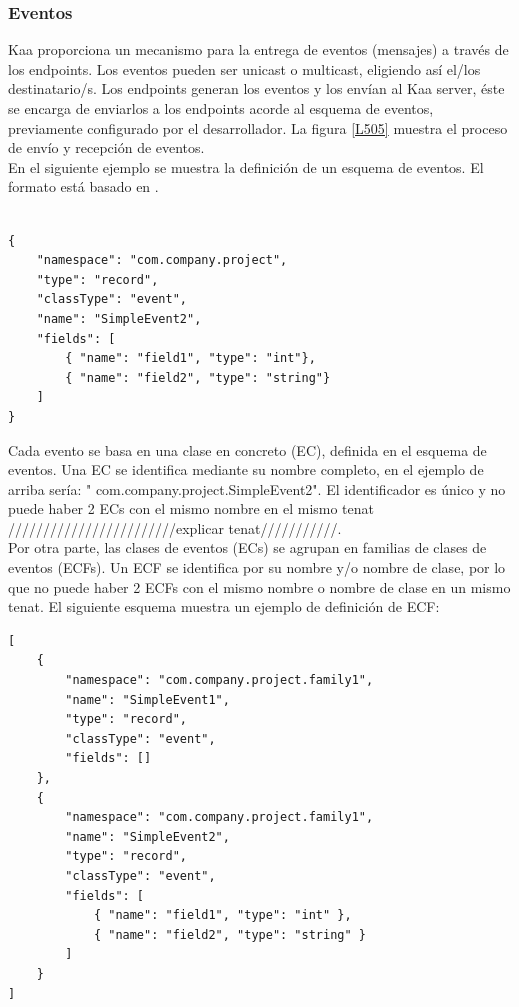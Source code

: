 \documentclass[12pt, twoside]{book}
\newcommand{\MYhref}[3][blue]{\href{#2}{\color{#1}{#3}}}
\begin{document}
\subsubsection*{Eventos}
Kaa proporciona un mecanismo para la entrega de eventos (mensajes) a través de los endpoints. Los eventos pueden ser unicast o multicast, eligiendo así el/los destinatario/s. Los endpoints generan los eventos y los envían al Kaa server, éste se encarga de enviarlos a los endpoints acorde al esquema de eventos, previamente configurado por el desarrollador. La figura \ref{L505} muestra el proceso de envío y recepción de eventos.\\
En el siguiente ejemplo se muestra la definición de un esquema de eventos. El formato está basado en \MYhref{http://avro.apache.org/docs/current/spec.html}{Avro Schema}.
\begin{lstlisting}

{
    "namespace": "com.company.project",
    "type": "record",
    "classType": "event",
    "name": "SimpleEvent2",
    "fields": [
        { "name": "field1", "type": "int"},
        { "name": "field2", "type": "string"}
    ]
}

\end{lstlisting}
Cada evento se basa en una clase en concreto (EC), definida en el esquema de eventos. Una EC se identifica mediante su nombre completo, en el ejemplo de arriba sería: " com.company.project.SimpleEvent2". El identificador es único y no puede haber 2 ECs con el mismo nombre en el mismo tenat ////////////////////////explicar tenat///////////.\\

Por otra parte, las clases de eventos (ECs) se agrupan en familias de clases de eventos (ECFs). Un ECF se identifica por su nombre y/o nombre de clase, por lo que no puede haber 2 ECFs con el mismo nombre o nombre de clase en un mismo tenat. El siguiente esquema muestra un ejemplo de definición de ECF:
\begin{lstlisting}
[
    {
        "namespace": "com.company.project.family1",
        "name": "SimpleEvent1",
        "type": "record",
        "classType": "event",
        "fields": []
    },
    {
        "namespace": "com.company.project.family1",
        "name": "SimpleEvent2",
        "type": "record",
        "classType": "event",
        "fields": [
            { "name": "field1", "type": "int" },
            { "name": "field2", "type": "string" }
        ]
    }
]
\end{lstlisting}
\end{document}
